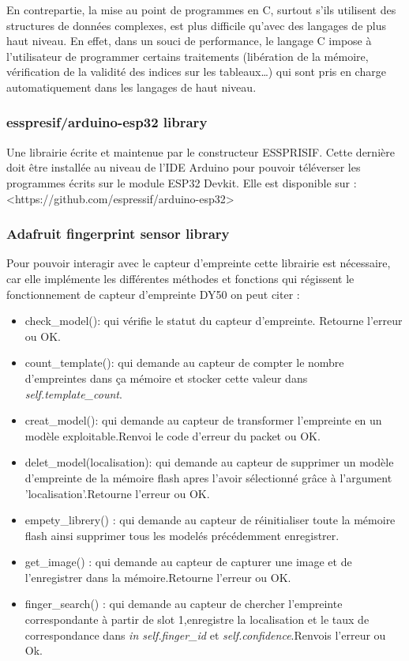                 En contrepartie, la mise au point de programmes en C, surtout s’ils utilisent des structures de données complexes, est plus difficile qu’avec des langages de plus haut niveau. En effet, dans un souci de performance, le langage C impose à l’utilisateur de programmer certains traitements (libération de la mémoire, vérification de la validité des indices sur les tableaux…) qui sont pris en charge automatiquement dans les langages de haut niveau\cite{35}.
                
                
             \subsubsection{esspresif/arduino-esp32 library}
             Une librairie écrite et maintenue par le constructeur ESSPRISIF. Cette dernière doit être installée au niveau de l'IDE Arduino pour pouvoir téléverser les programmes écrits sur le module ESP32 Devkit. Elle est disponible sur : <https://github.com/espressif/arduino-esp32>
             \subsubsection{Adafruit fingerprint sensor library}
              Pour pouvoir interagir avec le capteur d'empreinte cette librairie est nécessaire, car elle implémente les différentes méthodes et fonctions qui régissent le fonctionnement de capteur d'empreinte DY50 on peut citer :
              \begin{itemize}
                  \item[\textbullet] check\_model(): qui vérifie le statut du capteur d'empreinte. Retourne l'erreur ou OK.
                  \item[\textbullet] count\_template(): qui demande au capteur de compter le nombre d'empreintes dans ça mémoire et stocker cette valeur dans \emph{self.template\_count}.
                  \item[\textbullet] creat\_model(): qui demande au capteur de transformer l'empreinte en un modèle exploitable.Renvoi le code d'erreur du packet ou OK.
                  \item[\textbullet] delet\_model(localisation): qui demande au capteur de supprimer un modèle d'empreinte de la mémoire flash apres l'avoir sélectionné grâce à l'argument 'localisation'.Retourne l'erreur ou OK.
                  
                  \item[\textbullet] empety\_librery() : qui demande au capteur de réinitialiser toute la mémoire flash ainsi supprimer tous les modelés précédemment enregistrer. 
                  \item[\textbullet] get\_image() : qui demande au capteur de capturer une image et de l'enregistrer dans la mémoire.Retourne l'erreur ou OK. 
                  \item[\textbullet] finger\_search() : qui demande au capteur de chercher l'empreinte correspondante à partir de slot 1,enregistre la localisation et le taux de correspondance dans \emph{in self.finger\_id} et \emph{self.confidence}.Renvois l'erreur ou Ok.\cite{36}
              \end{itemize}
              
